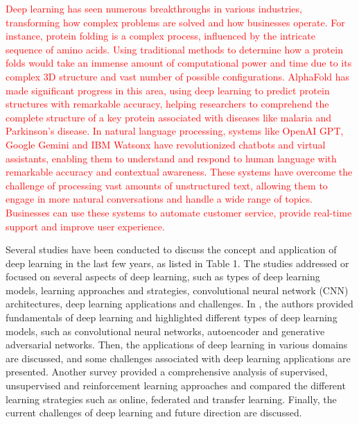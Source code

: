 \documentclass[preprint,12pt]{elsarticle}
\begin{document}
\textcolor{red}{Deep learning has seen numerous breakthroughs in various industries, transforming how complex problems are solved and how businesses operate. For instance, protein folding is a complex process, influenced by the intricate sequence of amino acids. Using traditional methods to determine how a protein folds would take an immense amount of computational power and time due to its complex 3D structure and vast number of possible configurations. AlphaFold \citep{noauthor_alphafold_2025} has made significant progress in this area, using deep learning to predict protein structures with remarkable accuracy, helping researchers to comprehend the complete structure of a key protein associated with diseases like malaria and Parkinson's disease. In natural language processing, systems like OpenAI GPT, Google Gemini and IBM Watsonx have revolutionized chatbots and virtual assistants, enabling them to understand and respond to human language with remarkable accuracy and contextual awareness. These systems have overcome the challenge of processing vast amounts of unstructured text, allowing them to engage in more natural conversations and handle a wide range of topics. Businesses can use these systems to automate customer service, provide real-time support and improve user experience.}

Several studies have been conducted to discuss the concept and application of deep learning in the last few years, as listed in Table 1. The studies addressed or focused on several aspects of deep learning, such as types of deep learning models, learning approaches and strategies, convolutional neural network (CNN) architectures, deep learning applications and challenges. In \citep{dong_survey_2021}, the authors provided fundamentals of deep learning and highlighted different types of deep learning models, such as convolutional neural networks, autoencoder and generative adversarial networks. Then, the applications of deep learning in various domains are discussed, and some challenges associated with deep learning applications are presented. Another survey \citep{talaei_khoei_deep_2023} provided a comprehensive analysis of supervised, unsupervised and reinforcement learning approaches and compared the different learning strategies such as online, federated and transfer learning. Finally, the current challenges of deep learning and future direction are discussed.
\end{document}
